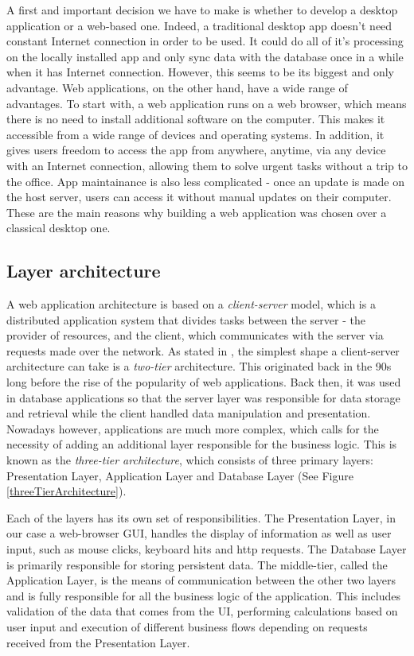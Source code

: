 A first and important decision we have to make is whether to develop a desktop application or a web-based one. Indeed, a traditional desktop app doesn't need constant Internet connection in order to be used. It could do all of it's processing on the locally installed app and only sync data with the database once in a while when it has Internet connection. However, this seems to be its biggest and only advantage. Web applications, on the other hand, have a wide range of advantages. To start with, a web application runs on a web browser, which means there is no need to install additional software on the computer. This makes it accessible from a wide range of devices and operating systems. In addition, it gives users freedom to access the app from anywhere, anytime, via any device with an Internet connection, allowing them to solve urgent tasks without a trip to the office. App maintainance is also less complicated - once an update is made on the host server, users can access it without manual updates on their computer. These are the main reasons why building a web application was chosen over a classical desktop one.

\subsection{Layer architecture}
\label{subsection:layerArchitecture}

A web application architecture is based on a \textit{client-server} model, which is a distributed application system that divides tasks between the server - the provider of resources, and the client, which communicates with the server via requests made over the network. As stated in \cite{databaseProgrammingWithJdbcAndJava}, the simplest shape a client-server architecture can take is a \textit{two-tier} architecture. This originated back in the 90s long before the rise of the popularity of web applications. Back then, it was used in database applications so that the server layer was responsible for data storage and retrieval while the client handled data manipulation and presentation. Nowadays however, applications are much more complex, which calls for the necessity of adding an additional layer responsible for the business logic. This is known as the \textit{three-tier architecture}, which consists of three primary layers: Presentation Layer, Application Layer and Database Layer (See Figure \ref{threeTierArchitecture}).

Each of the layers has its own set of responsibilities. The Presentation Layer, in our case a web-browser GUI, handles the display of information as well as user input, such as mouse clicks, keyboard hits and http requests. The Database Layer is primarily responsible for storing persistent data. The middle-tier, called the Application Layer, is the means of communication between the other two layers and is fully responsible for all the business logic of the application. This includes validation of the data that comes from the UI, performing calculations based on user input and execution of different business flows depending on requests received from the Presentation Layer.

